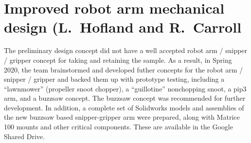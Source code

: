 \section{Improved robot arm mechanical design (L.~Hofland and R.~Carroll}
\label{sec:robotarmmechanical}

The preliminary design concept did not have a well accepted robot arm / snipper / gripper concept for taking and retaining the sample. As a result, in Spring 2020, the team brainstormed and developed futher concepts for the robot arm / snipper / gripper and backed them up with prototype testing, including a ``lawnmower'' (propeller snoot chopper), a ``guillotine'' nonchopping snoot, a pip3 arm, and a buzzsaw concept. The buzzsaw concept was recommended for further development. In addition, a complete set of Solidworks models and assemblies of the new buzzsaw based snipper-gripper arm were prepared, along with Matrice 100 mounts and other critical components. These are available in the Google Shared Drive.  

